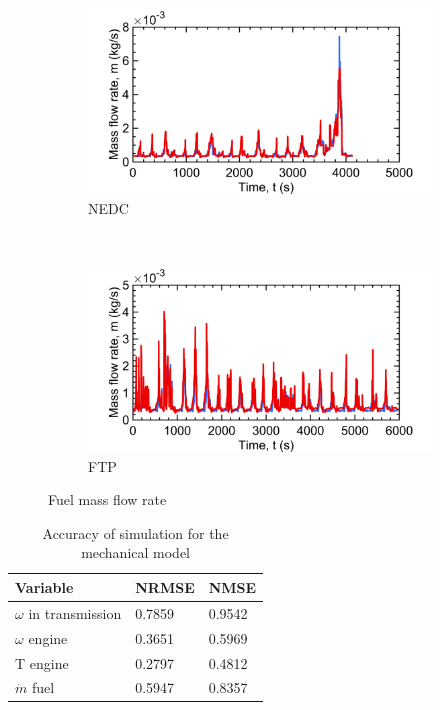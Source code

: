 \begin{figure}[ht]
  \centering
  \begin{subfigure}[b]{0.45\textwidth}
    \includegraphics[width=\textwidth]{figures/model/NEDC_plt_m_dot_f.png}
    \caption{NEDC}
    \label{fig:NEDC_m_dot_fuel}
  \end{subfigure}
  ~ %
  \begin{subfigure}[b]{0.45\textwidth}
    \includegraphics[width=\textwidth]{figures/model/FTP_plt_m_dot_f.png}
    \caption{FTP}
    \label{fig:FTP_m_dot_fuel}
  \end{subfigure}
  \caption{Fuel mass flow rate}\label{fig:m_dot_fuel}
\end{figure}

\begin{table}[]
  \centering
  \begin{tabular}{lll}
    \hline
    Variable               & NRMSE  & NMSE   \\ \hline
    $\omega$ in transmission & 0.7859 & 0.9542 \\
    $\omega$ engine          & 0.3651 & 0.5969 \\
    T engine               & 0.2797 & 0.4812 \\
    $\dot{m}$ fuel           & 0.5947 & 0.8357 \\ \hline
  \end{tabular}
  \caption{Accuracy of simulation for the mechanical model}
  \label{tab:accuracy_mechanical}
\end{table}


